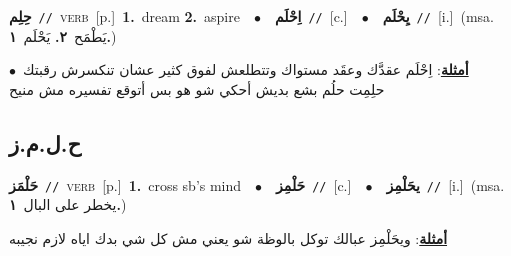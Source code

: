 \documentclass[10pt,a4paper,twoside]{article} %
\begin{document}
\begin{multicols}{2}
{\setlength\topsep{0pt}\textbf{\foreignlanguage{arabic}{حِلِم}}\ {\color{gray}\texttt{//}\color{black}}\ \textsc{verb}\ [p.]\ \textbf{1.}~dream  \textbf{2.}~aspire\ \ $\bullet$\ \ \setlength\topsep{0pt}\textbf{\foreignlanguage{arabic}{اِحْلَم}}\ {\color{gray}\texttt{//}\color{black}}\ [c.]\ \ $\bullet$\ \ \setlength\topsep{0pt}\textbf{\foreignlanguage{arabic}{يِحْلَم}}\ {\color{gray}\texttt{//}\color{black}}\ [i.]\ \color{gray}(msa. \foreignlanguage{arabic}{يَطْمَح}~\foreignlanguage{arabic}{\textbf{٢.}}  \foreignlanguage{arabic}{يَحْلَم}~\foreignlanguage{arabic}{\textbf{١.}})\color{black}\  \begin{flushright}\color{gray}\foreignlanguage{arabic}{\textbf{\underline{\foreignlanguage{arabic}{أمثلة}}}: اِحْلَم عقدَّك وعقَد مستواك وتتطلعش لفوق كثير عشان تنكسرش رقبتك\ $\bullet$\ \  حلِمِت حلُم بشع بديش أحكي شو هو بس أتوقع تفسيره مش منيح}\end{flushright}\color{black}} \vspace{2mm}

\vspace{-3mm}
\subsection*{\color{blue}\foreignlanguage{arabic}{ح.ل.م.ز}\color{blue}{}} 

{\setlength\topsep{0pt}\textbf{\foreignlanguage{arabic}{حَلْمَز}}\ {\color{gray}\texttt{//}\color{black}}\ \textsc{verb}\ [p.]\ \textbf{1.}~cross sb's mind\ \ $\bullet$\ \ \setlength\topsep{0pt}\textbf{\foreignlanguage{arabic}{حَلْمِز}}\ {\color{gray}\texttt{//}\color{black}}\ [c.]\ \ $\bullet$\ \ \setlength\topsep{0pt}\textbf{\foreignlanguage{arabic}{يحَلْمِز}}\ {\color{gray}\texttt{//}\color{black}}\ [i.]\ \color{gray}(msa. \foreignlanguage{arabic}{يخطر على البال}~\foreignlanguage{arabic}{\textbf{١.}})\color{black}\  \begin{flushright}\color{gray}\foreignlanguage{arabic}{\textbf{\underline{\foreignlanguage{arabic}{أمثلة}}}: ويحَلْمِز عبالك توكل بالوظة شو يعني مش كل شي بدك اياه لازم نجيبه}\end{flushright}\color{black}} \vspace{2mm}


\end{multicols}
\end{document}
